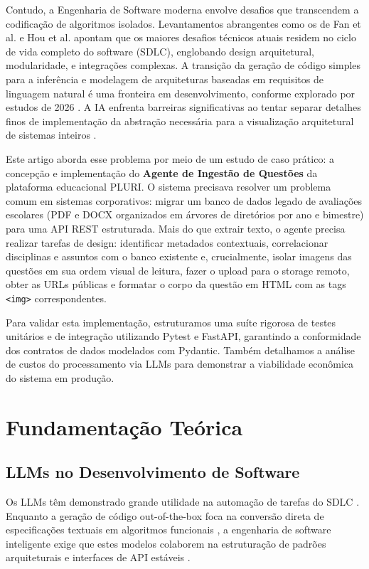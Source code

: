 \documentclass[sigconf]{acmart}
\begin{document}
Contudo, a Engenharia de Software moderna envolve desafios que transcendem a codificação de algoritmos isolados. Levantamentos abrangentes como os de Fan et al. \cite{fan2023large} e Hou et al. \cite{hou2024survey} apontam que os maiores desafios técnicos atuais residem no ciclo de vida completo do software (SDLC), englobando design arquitetural, modularidade, e integrações complexas. A transição da geração de código simples para a inferência e modelagem de arquiteturas baseadas em requisitos de linguagem natural é uma fronteira em desenvolvimento, conforme explorado por estudos de 2026 \cite{canai2026build, empirical2026architectural}. A IA enfrenta barreiras significativas ao tentar separar detalhes finos de implementação da abstração necessária para a visualização arquitetural de sistemas inteiros \cite{automated2026view}.

Este artigo aborda esse problema por meio de um estudo de caso prático: a concepção e implementação do \textbf{Agente de Ingestão de Questões} da plataforma educacional PLURI. O sistema precisava resolver um problema comum em sistemas corporativos: migrar um banco de dados legado de avaliações escolares (PDF e DOCX organizados em árvores de diretórios por ano e bimestre) para uma API REST estruturada. Mais do que extrair texto, o agente precisa realizar tarefas de design: identificar metadados contextuais, correlacionar disciplinas e assuntos com o banco existente e, crucialmente, isolar imagens das questões em sua ordem visual de leitura, fazer o upload para o storage remoto, obter as URLs públicas e formatar o corpo da questão em HTML com as tags \lstinline{<img>} correspondentes.

Para validar esta implementação, estruturamos uma suíte rigorosa de testes unitários e de integração utilizando Pytest e FastAPI, garantindo a conformidade dos contratos de dados modelados com Pydantic. Também detalhamos a análise de custos do processamento via LLMs para demonstrar a viabilidade econômica do sistema em produção.

\section{Fundamentação Teórica}

\subsection{LLMs no Desenvolvimento de Software}
Os LLMs têm demonstrado grande utilidade na automação de tarefas do SDLC \cite{fan2023large, hou2024survey}. Enquanto a geração de código out-of-the-box foca na conversão direta de especificações textuais em algoritmos funcionais \cite{chen2021evaluating}, a engenharia de software inteligente exige que estes modelos colaborem na estruturação de padrões arquiteturais e interfaces de API estáveis \cite{empirical2026architectural}.
\end{document}
